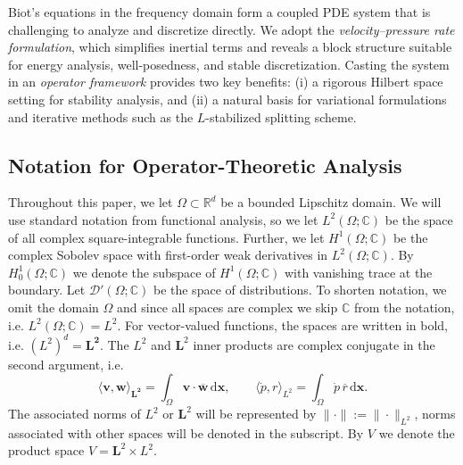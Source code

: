 \documentclass[pdflatex,sn-mathphys-num]{sn-jnl}
\theoremstyle{thmstyleone}%
\theoremstyle{thmstyletwo}%
\theoremstyle{thmstylethree}%
\def \r  {\rho}
\theoremstyle{definition}
\begin{document}
	Biot’s equations in the frequency domain form a coupled PDE system that is challenging to analyze and discretize directly. We adopt the \emph{velocity–pressure rate formulation}, which simplifies inertial terms and reveals a block structure suitable for energy analysis, well-posedness, and stable discretization. 
	Casting the system in an \emph{operator framework} provides two key benefits: 
	(i) a rigorous Hilbert space setting for stability analysis, and 
	(ii) a natural basis for variational formulations and iterative methods such as the $L$-stabilized splitting scheme.
	
	\subsection{Notation for Operator-Theoretic Analysis}
	
	Throughout this paper, we let $\Omega \subset \mathbb{R}^d$ be a bounded Lipschitz domain.  We will use standard notation from functional analysis, so we let $L^{2}(\Omega;\mathbb{C})$ be the space of all complex square-integrable functions.  Further, we let $H^{1}(\Omega;\mathbb{C})$ be the complex Sobolev space with first-order weak derivatives in $L^{2}(\Omega;\mathbb{C})$. By $H^{1}_{0}(\Omega;\mathbb{C})$ we denote the subspace of $H^{1}(\Omega;\mathbb{C})$ with vanishing trace at the boundary. Let $\mathscr{D}'(\Omega;\mathbb{C})$ be the space of distributions. To shorten notation, we omit the domain $\Omega$ and since all spaces are complex we skip $\mathbb{C}$ from the notation, i.e. $L^{2}(\Omega;\mathbb{C})=L^{2}$. For vector-valued functions, the spaces are written in bold, i.e. $(L^{2})^{d}=\bm{L^{2}}$.
	The $L^{2}$ and $\bm{L}^{2}$ inner products are complex conjugate in the second argument, i.e.
	\[
	\langle \mathbf{v}, \mathbf{w} \rangle_{\bm{L^{2}}} = \int_\Omega \mathbf{v}\cdot\overline{\mathbf{w}}\,\mathrm{d}\mathbf{x}, \qquad
	\langle \dot{p}, r \rangle_{L^{2}} = \int_\Omega \dot{p}\,\overline{r}\,\mathrm{d}\mathbf{x}.
	\]
	The associated norms of $L^{2}$ or $\bm{L}^{2}$ will be represented by $\|\cdot\|:=\|\cdot\|_{L^{2}}$, norms associated with other spaces will be denoted in the subscript. By $V$ we denote the product space $V = \bm{L}^{2} \times L^{2}$.
	
\end{document}
